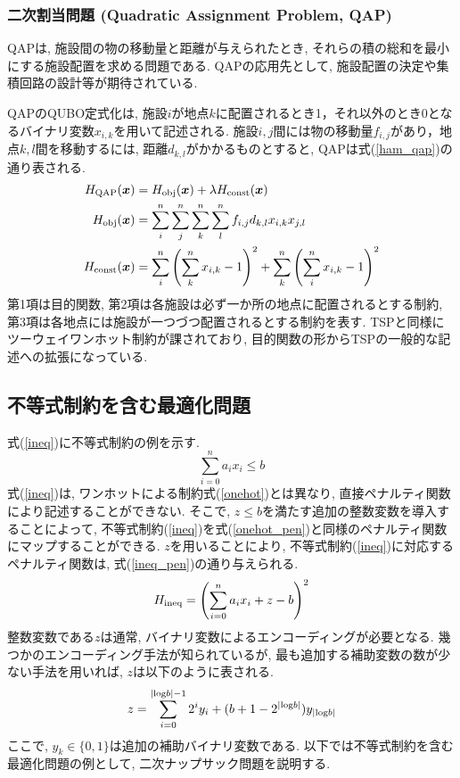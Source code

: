 \documentclass[submit,techrep,noauthor]{ipsj}
\begin{document}
\subsubsection{二次割当問題 (Quadratic Assignment Problem, QAP)}
QAPは, 施設間の物の移動量と距離が与えられたとき, それらの積の総和を最小にする施設配置を求める問題である. QAPの応用先として, 施設配置の決定や集積回路の設計等が期待されている.

QAPのQUBO定式化は, 施設$i$が地点$k$に配置されるとき1，それ以外のとき0となるバイナリ変数$x_{i,k}$を用いて記述される. 施設$i, j$間には物の移動量$f_{i,j}$があり，地点$k, l$間を移動するには, 距離$d_{k, l}$がかかるものとすると,
 QAPは式(\ref{ham_qap})の通り表される.
\begin{align}
H_{\rm{QAP}}(\bm{x}) &= H_{\rm{obj}}(\bm{x}) + \lambda H_{\rm{const}}(\bm{x})\nonumber\\
H_{\rm{obj}}(\bm{x}) &= \sum_{i}^{n}\sum_{j}^{n}\sum_{k}^{n}\sum_{l}^{n}f_{i,j}d_{k,l}x_{i,k}x_{j,l}\nonumber\\
H_{\rm{const}}(\bm{x}) &= \sum_{i}^{n}\left(\sum_{k}^{n}x_{i,k}-1\right)^{2} + \sum_{k}^{n}\left(\sum_{i}^{n}x_{i,k}-1\right)^{2} \label{ham_qap}
\end{align}
第1項は目的関数, 第2項は各施設は必ず一か所の地点に配置されるとする制約, 第3項は各地点には施設が一つづつ配置されるとする制約を表す. TSPと同様にツーウェイワンホット制約が課されており, 目的関数の形からTSPの一般的な記述への拡張になっている.

\subsection{不等式制約を含む最適化問題}
式(\ref{ineq})に不等式制約の例を示す.
\begin{equation}
\sum_{i=0}^{n}a_{i}x_{i}\le b \label{ineq}
\end{equation}
式(\ref{ineq})は, ワンホットによる制約式(\ref{onehot})とは異なり, 直接ペナルティ関数により記述することができない. そこで, $z\le b$を満たす追加の整数変数を導入することによって, 不等式制約(\ref{ineq})を式(\ref{onehot_pen})と同様のペナルティ関数にマップすることができる. $z$を用いることにより, 不等式制約(\ref{ineq})に対応するペナルティ関数は, 式(\ref{ineq_pen})の通り与えられる.
\begin{equation}
H_{\rm{ineq}} = \left(\sum_{i=0}^{n}a_{i}x_{i}+z-b\right)^{2} \label{ineq_pen}
\end{equation}
整数変数である$z$は通常, バイナリ変数によるエンコーディングが必要となる. 幾つかのエンコーディング手法が知られているが, 最も追加する補助変数の数が少ない手法を用いれば, $z$は以下のように表される.
\begin{equation}
z = \sum_{i=0}^{|{\rm{log}}b|-1}2^{i}y_{i}+(b+1-2^{|{\rm{log}}b|})y_{|{\rm{log}}b|}
\end{equation}
ここで, $y_{k}\in \{0, 1\}$は追加の補助バイナリ変数である. 以下では不等式制約を含む最適化問題の例として, 二次ナップサック問題を説明する.
\end{document}
